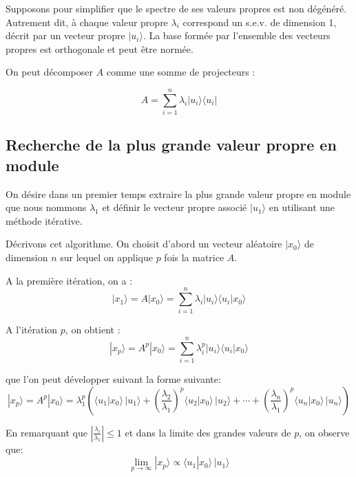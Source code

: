 \documentclass[a4paper, 12pt]{article}
\begin{document}
Supposons pour simplifier que le spectre de ses valeurs propres est non dégénéré.
Autrement dit, à chaque valeur propre $\lambda_i$ correspond un s.e.v. de dimension 1,
décrit par un vecteur propre $| u_i\rangle$.  La base formée par l'ensemble des vecteurs propres
est orthogonale et peut être normée.


On peut décomposer $A$ comme une somme de projecteurs :

\begin{equation}
A= \sum_{i=1}^{n} \lambda_i | u_i\rangle \langle u_i |
\end{equation}

\subsection{Recherche de la plus grande valeur propre en module}

On désire dans un premier temps extraire la plus grande valeur propre en module que nous nommons 
$\lambda_1$ et définir le
vecteur propre associé $| u_1\rangle$ en utilisant une méthode itérative.

Décrivons cet algorithme.
On choisit d'abord un vecteur aléatoire $|x_0 \rangle$ de dimension $n$ sur lequel on applique $p$
fois la matrice $A$. 

A la première itération, on a :
\begin{equation}
|x_1 \rangle = A |x_0 \rangle = \sum_{i=1}^{n} \lambda_i | u_i\rangle \langle u_i |x_0 \rangle
\end{equation}

A l'itération $p$, on obtient :
\begin{equation}
|x_p \rangle = A^p |x_0 \rangle = \sum_{i=1}^{n} \lambda_i^p | u_i\rangle \langle u_i |x_0 \rangle
\end{equation}

que l'on peut développer suivant la forme suivante:
\begin{equation}
|x_p \rangle = A^p |x_0 \rangle =\lambda_1^p \left( \langle u_1 |x_0 \rangle \, | u_1\rangle 
+\left(\frac{\lambda_2}{\lambda_1}\right)^p \langle u_2 |x_0 \rangle \, | u_2\rangle +
\cdots
+\left(\frac{\lambda_n}{\lambda_1}\right)^p \langle u_n |x_0 \rangle \, | u_n\rangle 
\right) \end{equation}

En remarquant que $|\frac{\lambda_i}{\lambda_1}| \leq 1$ et dans la limite des grandes valeurs
de $p$, on observe que:
\begin{equation}
\lim_{p \rightarrow \infty}
|x_p \rangle \propto \langle u_1 |x_0 \rangle \, | u_1\rangle  
\end{equation}
\end{document}
